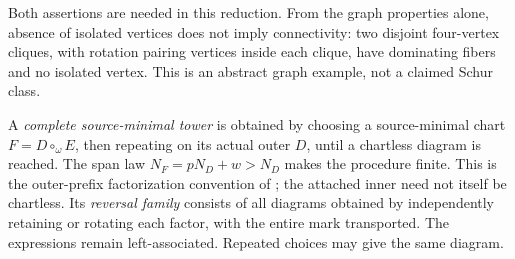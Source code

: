 \documentclass[11pt,a4paper]{amsart}
\numberwithin{equation}{section}
\theoremstyle{plain}
\theoremstyle{definition}
\begin{document}
Both assertions are needed in this reduction.  From the graph properties alone, absence of isolated vertices does not imply connectivity: two disjoint four-vertex cliques, with rotation pairing vertices inside each clique, have dominating fibers and no isolated vertex.  This is an abstract graph example, not a claimed Schur class.

A \emph{complete source-minimal tower} is obtained by choosing a source-minimal chart \(F=D\circ_\omega E\), then repeating on its actual outer \(D\), until a chartless diagram is reached.  The span law \(N_F=pN_D+w>N_D\) makes the procedure finite.  This is the outer-prefix factorization convention of \cite[Def.~5.5]{McNamara2009Classification}; the attached inner need not itself be chartless.  Its \emph{reversal family} consists of all diagrams obtained by independently retaining or rotating each factor, with the entire mark transported.  The expressions remain left-associated.  Repeated choices may give the same diagram.
\end{document}
